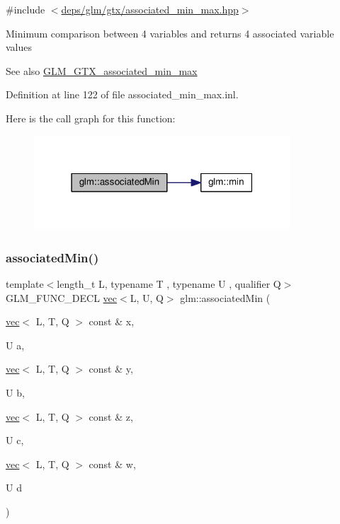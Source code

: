 {\ttfamily \#include $<$\hyperlink{associated__min__max_8hpp}{deps/glm/gtx/associated\+\_\+min\+\_\+max.\+hpp}$>$}

Minimum comparison between 4 variables and returns 4 associated variable values \begin{DoxySeeAlso}{See also}
\hyperlink{group__gtx__associated__min__max}{G\+L\+M\+\_\+\+G\+T\+X\+\_\+associated\+\_\+min\+\_\+max} 
\end{DoxySeeAlso}


Definition at line 122 of file associated\+\_\+min\+\_\+max.\+inl.

Here is the call graph for this function\+:
\nopagebreak
\begin{figure}[H]
\begin{center}
\leavevmode
\includegraphics[width=271pt]{d6/d10/group__gtx__associated__min__max_ga78c28fde1a7080fb7420bd88e68c6c68_cgraph}
\end{center}
\end{figure}
\mbox{\label{group__gtx__associated__min__max_ga2db7e351994baee78540a562d4bb6d3b}} 
\subsubsection{\texorpdfstring{associated\+Min()}{associatedMin()}\hspace{0.1cm}{\footnotesize\ttfamily [10/10]}}
{\footnotesize\ttfamily template$<$length\+\_\+t L, typename T , typename U , qualifier Q$>$ \\
G\+L\+M\+\_\+\+F\+U\+N\+C\+\_\+\+D\+E\+CL \hyperlink{structglm_1_1vec}{vec}$<$L, U, Q$>$ glm\+::associated\+Min (\begin{DoxyParamCaption}\item[{\hyperlink{structglm_1_1vec}{vec}$<$ L, T, Q $>$ const \&}]{x,  }\item[{U}]{a,  }\item[{\hyperlink{structglm_1_1vec}{vec}$<$ L, T, Q $>$ const \&}]{y,  }\item[{U}]{b,  }\item[{\hyperlink{structglm_1_1vec}{vec}$<$ L, T, Q $>$ const \&}]{z,  }\item[{U}]{c,  }\item[{\hyperlink{structglm_1_1vec}{vec}$<$ L, T, Q $>$ const \&}]{w,  }\item[{U}]{d }\end{DoxyParamCaption})}



